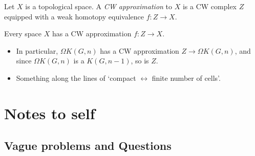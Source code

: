 \documentclass{MetricNotes2023}
\begin{document}
\begin{definition}
Let \(X\) is a topological space. A \textit{CW approximation} to \(X\) is a CW complex \(Z\) equipped with a weak homotopy equivalence \(f : Z \to X\).
\end{definition}

\begin{theorem}
Every space \(X\) has a CW approximation \(f : Z \to X\). %
\end{theorem}

\begin{itemize}
\item In particular, \(\Omega K(G, n)\) has a CW approximation \(Z \to \Omega K(G, n)\), and since \(\Omega K(G,n)\) is a \(K(G,n-1)\), so is \(Z\). 
\item Something along the lines of `compact \(\leftrightarrow\) finite number of cells'.
\end{itemize}

\section{Notes to self}\label{C}

\subsection{Vague problems and Questions}
\end{document}
